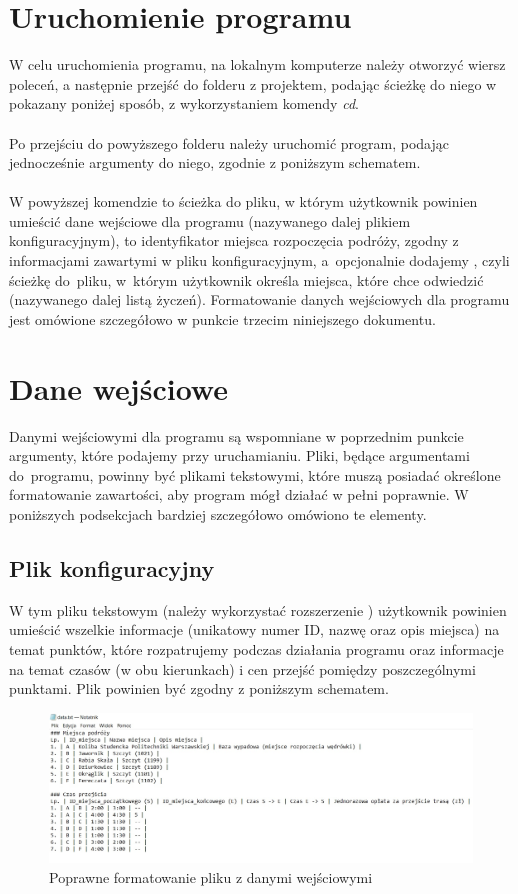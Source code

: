 \documentclass[12pt,a4paper]{article}
\begin{document}
\section{Uruchomienie programu}
W celu uruchomienia programu, na lokalnym komputerze należy otworzyć wiersz poleceń, a następnie przejść do folderu z projektem, podając ścieżkę do niego w pokazany poniżej sposób, z wykorzystaniem komendy \textsl{cd}.\smallskip\\
\smallskip
{}\\
\indent Po przejściu do powyższego folderu należy uruchomić program, podając jednocześnie argumenty do niego, zgodnie z poniższym schematem.\smallskip\\
{\scriptsize{}\smallskip\\}
\indent W powyższej komendzie  to ścieżka do pliku, w którym użytkownik powinien umieścić dane wejściowe dla programu (nazywanego dalej plikiem konfiguracyjnym),  to identyfikator miejsca rozpoczęcia podróży, zgodny z informacjami zawartymi w pliku konfiguracyjnym, a~opcjonalnie dodajemy , czyli ścieżkę do~pliku, w~którym użytkownik określa miejsca, które chce odwiedzić (nazywanego dalej listą życzeń). Formatowanie danych wejściowych dla programu jest omówione szczegółowo w punkcie trzecim niniejszego dokumentu.
\section{Dane wejściowe}
Danymi wejściowymi dla programu są wspomniane w poprzednim punkcie argumenty, które podajemy przy uruchamianiu. Pliki, będące argumentami do~programu, powinny być plikami tekstowymi, które muszą posiadać określone formatowanie zawartości, aby program mógł działać w pełni poprawnie. W poniższych podsekcjach bardziej szczegółowo omówiono te elementy.\\
\newpage
\subsection{Plik konfiguracyjny}
W tym pliku tekstowym (należy wykorzystać rozszerzenie ) użytkownik powinien umieścić wszelkie informacje (unikatowy numer ID, nazwę oraz opis miejsca) na temat punktów, które rozpatrujemy podczas działania programu oraz informacje na temat czasów (w obu kierunkach) i cen przejść pomiędzy poszczególnymi punktami. Plik powinien być zgodny z poniższym schematem.
\begin{figure}[h!]
\includegraphics[width = \linewidth]{data.jpg}
\caption{Poprawne formatowanie pliku z danymi wejściowymi}
\end{figure}
\end{document}
